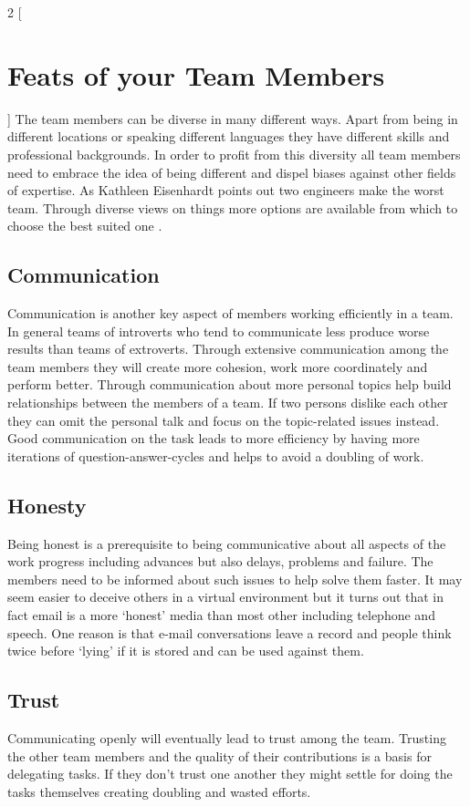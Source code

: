 \begin{multicols}{2}
[\section{Feats of your Team Members}]
The team members can be diverse in many different ways. Apart from being in different locations or speaking different languages they have different skills and professional backgrounds. In order to profit from this diversity all team members need to embrace the idea of being different and dispel biases against other fields of expertise. As Kathleen Eisenhardt points out two engineers make the worst team. Through diverse views on things more options are available from which to choose the best suited one \cite{eisenhardt}.

\subsection{Communication}
Communication is another key aspect of members working efficiently in a team. In general teams of introverts who tend to communicate less produce worse results than teams of extroverts. Through extensive communication among the team members they will create more cohesion, work more coordinately and perform better. Through communication about more personal topics help build relationships between the members of a team. If two persons dislike each other they can omit the personal talk and focus on the topic-related issues instead. Good communication on the task leads to more efficiency by having more iterations of question-answer-cycles and helps to avoid a doubling of work\cite{belbin1996management}.

\subsection{Honesty}
Being honest is a prerequisite to being communicative about all aspects of the work progress including advances but also delays, problems and failure. The members need to be informed about such issues to help solve them faster. It may seem easier to deceive others in a virtual environment but it turns out that in fact email is a more ‘honest’ media than most other including telephone and speech. One reason is that e-mail conversations leave a record and people think twice before ‘lying’ if it is stored and can be used against them\cite{TED}.

\subsection{Trust}
Communicating openly will eventually lead to trust among the team. Trusting the other team members and the quality of their contributions is a basis for delegating tasks. If they don’t trust one another they might settle for doing the tasks themselves creating doubling and wasted efforts.


\end{multicols}

